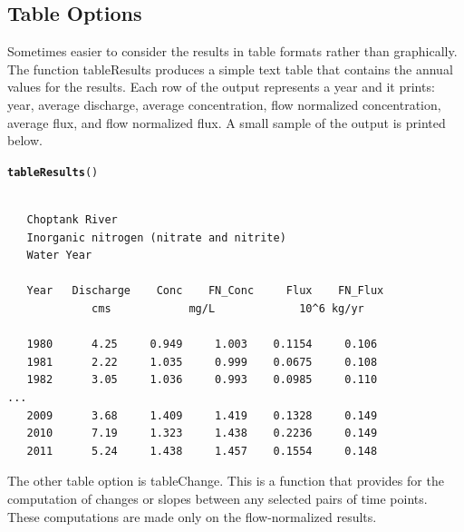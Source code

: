 \documentclass[a4paper,11pt]{article}\usepackage{graphicx, color}
\makeatletter
\newcommand{\hlfunctioncall}[1]{\textcolor[rgb]{0.501960784313725,0,0.329411764705882}{\textbf{#1}}}%
\newenvironment{kframe}{%
 \def\at@end@of@kframe{}%
 \ifinner\ifhmode%
  \def\at@end@of@kframe{\end{minipage}}%
  \begin{minipage}{\columnwidth}%
 \fi\fi%
 \def\FrameCommand##1{\hskip\@totalleftmargin \hskip-\fboxsep
 \colorbox{shadecolor}{##1}\hskip-\fboxsep
     \hskip-\linewidth \hskip-\@totalleftmargin \hskip\columnwidth}%
 \MakeFramed {\advance\hsize-\width
   \@totalleftmargin\z@ \linewidth\hsize
   \@setminipage}}%
 {\par\unskip\endMakeFramed%
 \at@end@of@kframe}
\newenvironment{knitrout}{}{} %
\makeatother
\begin{document}
\FloatBarrier
\subsection{Table Options}
\label{sec:wrtdsTable}
Sometimes easier to consider the results in table formats rather than graphically. The function tableResults produces a simple text table that contains the annual values for the results.  Each row of the output represents a year and it prints: year, average discharge, average concentration, flow normalized concentration, average flux, and flow normalized flux.  A small sample of the output is printed below.

\begin{knitrout}
\color{fgcolor}\begin{kframe}
\begin{alltt}
\hlfunctioncall{tableResults}()
\end{alltt}
\end{kframe}
\end{knitrout}



\begin{verbatim}

   Choptank River 
   Inorganic nitrogen (nitrate and nitrite)
   Water Year 

   Year   Discharge    Conc    FN_Conc     Flux    FN_Flux
             cms            mg/L             10^6 kg/yr 

   1980      4.25     0.949     1.003    0.1154     0.106
   1981      2.22     1.035     0.999    0.0675     0.108
   1982      3.05     1.036     0.993    0.0985     0.110
...
   2009      3.68     1.409     1.419    0.1328     0.149
   2010      7.19     1.323     1.438    0.2236     0.149
   2011      5.24     1.438     1.457    0.1554     0.148
\end{verbatim}


The other table option is tableChange. This is a function that provides for the computation of changes or slopes between any selected pairs of time points.  These computations are made only on the flow-normalized results.
\end{document}
